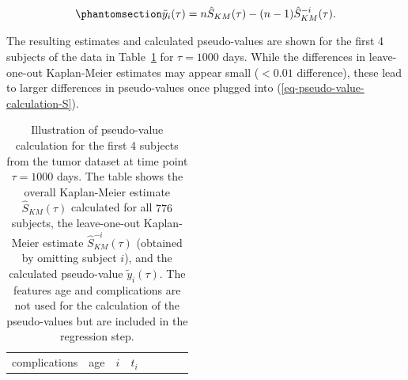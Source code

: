 \documentclass[
  letterpaper,
  krantz2]{style/krantz}
\begin{document}
\begin{equation}\phantomsection\label{eq-pseudo-value-calculation-S}{
\tilde{y}_i(\tau) = n\hat{S}_{KM}(\tau) - (n-1)\hat{S}_{KM}^{-i}(\tau).
}\end{equation}

The resulting estimates and calculated pseudo-values are shown for the
first 4 subjects of the data in Table~\ref{tbl-pseudo-value-calculation}
for \(\tau = 1000\) days. While the differences in leave-one-out
Kaplan-Meier estimates may appear small (\(<0.01\) difference), these
lead to larger differences in pseudo-values once plugged into
(\ref{eq-pseudo-value-calculation-S}).

\begin{longtable}[]{@{}
  >{\raggedright\arraybackslash}p{}
  >{\raggedleft\arraybackslash}p{}
  >{\raggedleft\arraybackslash}p{}
  >{\raggedleft\arraybackslash}p{}
  >{\raggedleft\arraybackslash}p{}
  >{\raggedleft\arraybackslash}p{}
  >{\raggedleft\arraybackslash}p{}
  >{\raggedleft\arraybackslash}p{}@{}}
\caption{Illustration of pseudo-value calculation for the first 4
subjects from the tumor dataset at time point \(\tau = 1000\) days. The
table shows the overall Kaplan-Meier estimate \(\hat{S}_{KM}(\tau)\)
calculated for all \(776\) subjects, the leave-one-out Kaplan-Meier
estimate \(\hat{S}_{KM}^{-i}(\tau)\) (obtained by omitting subject
\(i\)), and the calculated pseudo-value \(\tilde{y}_i(\tau)\). The
features age and complications are not used for the calculation of the
pseudo-values but are included in the regression
step.}\label{tbl-pseudo-value-calculation}\tabularnewline
\toprule\noalign{}
\begin{minipage}[b]{\linewidth}\raggedright
complications
\end{minipage} & \begin{minipage}[b]{\linewidth}\raggedleft
age
\end{minipage} & \begin{minipage}[b]{\linewidth}\raggedleft
\(i\)
\end{minipage} & \begin{minipage}[b]{\linewidth}\raggedleft
\(t_i\)
\end{minipage} & \begin{minipage}[b]{\linewidth}\raggedleft

\end{minipage}
\end{longtable}
\end{document}
